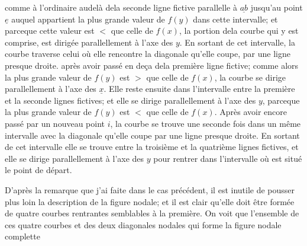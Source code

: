 \documentclass[11pt,a4paper]{article}
\begin{document}

comme à l'ordinaire audelà dela seconde ligne fictive parallelle à
$\underline{ab}$ jusqu'au point $\underline{e}$ auquel appartient la plus grande valeur
de $f(y)$ dans cette intervalle; et parceque cette valeur est $<$ que
celle de $f(x)$, la portion dela courbe qui y est comprise, est
dirigée parallellement à l'axe des $y$. En sortant de cet intervalle,
la courbe traverse  celui où elle rencontre la
diagonale qu'elle coupe, par une ligne presque droite. 
après avoir passé  en deça dela première ligne fictive;  comme
alors la plus grande valeur de $f(y)$ est $>$ que celle de $f(x)$,
la courbe se dirige parallellement à l'axe des $\underline{x}$.
Elle reste ensuite dans l'intervalle entre la première et
la seconde lignes fictives; et elle se dirige parallellement à
l'axe des $y$, parceque la plus grande valeur de $f(y)$ est $<$
que celle de $f(x)$. Après avoir encore passé par un nouveau
point $i$, la courbe se trouve une seconde fois dans un même
intervalle avec la diagonale qu'elle coupe par une ligne
presque droite. En sortant de cet intervalle elle se trouve
entre la troisième et la quatrième lignes fictives, et elle se
dirige parallellement à l'axe des $y$ pour rentrer dans
l'intervalle où est situé le point de départ.

D'après la remarque que j'ai faite dans le cas précédent,
il est inutile de pousser plus loin la description de
la figure nodale; et il est clair qu'elle doit être formée
de quatre courbes rentrantes semblables à  la première.
On voit que l'ensemble de ces quatre courbes et des deux
diagonales nodales qui forme la figure nodale complette
\end{document}
